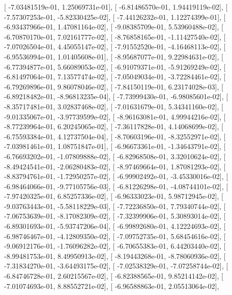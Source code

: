 \documentclass{article}
\begin{document}
       [ -7.03481519e-01,   1.25069731e-01],
       [ -6.81486570e-01,   1.94419119e-02],
       [ -7.57307253e-01,  -5.82330425e-02],
       [ -7.44126232e-01,   1.12274399e-01],
       [ -6.93437966e-01,   1.47081164e-02],
       [ -9.08385709e-01,   5.53960488e-02],
       [ -6.70870170e-01,   7.02161777e-02],
       [ -8.76858165e-01,  -1.11427540e-02],
       [ -7.07026504e-01,   4.45055147e-02],
       [ -7.91552520e-01,  -4.16468113e-02],
       [ -6.95536994e-01,   1.01405608e-01],
       [ -8.95687077e-01,   9.22984631e-02],
       [ -6.77394877e-01,   5.66089053e-02],
       [ -6.91079371e-01,  -5.91269249e-02],
       [ -6.81497064e-01,   7.13577474e-02],
       [ -7.05049034e-01,  -3.72284461e-02],
       [ -6.79269896e-01,   9.86078046e-02],
       [ -7.84150119e-01,   6.23174028e-03],
       [ -6.89218482e-01,  -8.96813235e-04],
       [ -7.73999430e-01,  -6.98085601e-02],
       [ -8.35717481e-01,   3.02837468e-02],
       [ -7.01631679e-01,   5.34341160e-02],
       [ -9.01335067e-01,  -3.97739599e-02],
       [ -8.96163081e-01,   4.99944216e-02],
       [ -8.77239964e-01,   6.20245065e-02],
       [ -7.36117828e-01,   4.14068699e-02],
       [ -6.75593384e-01,   4.12737504e-04],
       [ -8.70603196e-01,  -8.32552971e-02],
       [ -7.03981461e-01,   1.08751847e-01],
       [ -6.96673361e-01,  -1.34643791e-02],
       [ -6.76693202e-01,  -1.07809888e-02],
       [ -6.82968508e-01,   3.32010624e-02],
       [ -8.49424541e-01,  -2.06280483e-02],
       [ -8.97469664e-01,   1.87081293e-02],
       [ -8.83794761e-01,  -1.72950257e-02],
       [ -6.99902492e-01,  -3.45330016e-02],
       [ -6.98464066e-01,  -9.77105756e-03],
       [ -6.81226298e-01,  -4.08744101e-02],
       [ -7.97420325e-01,   6.85257336e-02],
       [ -6.96333023e-01,   5.98712945e-02],
       [ -9.03763443e-01,  -5.58118229e-03],
       [ -7.72236850e-01,   7.79340744e-02],
       [ -7.06753639e-01,  -8.17082309e-02],
       [ -7.32399906e-01,   5.30893014e-02],
       [ -6.89301693e-01,  -5.93747206e-04],
       [ -6.99892680e-01,   4.12224693e-02],
       [ -6.98746467e-01,  -4.12809350e-02],
       [ -7.09752735e-01,   5.68454616e-02],
       [ -9.06912176e-01,  -1.76096282e-02],
       [ -6.70655383e-01,   6.44203440e-02],
       [ -8.99481753e-01,   8.49950913e-02],
       [ -8.19443268e-01,  -8.78060936e-02],
       [ -7.31834270e-01,  -3.64493175e-02],
       [ -7.02538329e-01,  -7.07258744e-02],
       [ -6.84746728e-01,   2.60215567e-02],
       [ -6.82388565e-01,   9.85214142e-02],
       [ -7.01074693e-01,   8.88552721e-02],
       [ -6.96588863e-01,   2.05513064e-02],
\end{document}
